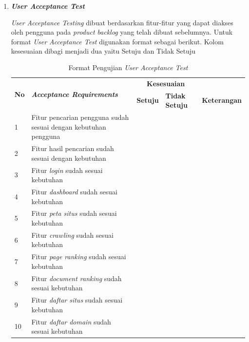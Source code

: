 \begin{enumerate}[leftmargin=1\parindent]
	\item \textit{\textbf{User Acceptance Test}}
	
	\textit{User Acceptance Testing} dibuat berdasarkan fitur-fitur yang dapat diakses oleh pengguna pada \textit{product backlog} yang telah dibuat sebelumnya. Untuk format \textit{User Acceptance Test} digunakan format sebagai berikut. Kolom kesesuaian dibagi menjadi dua yaitu Setuju dan Tidak Setuju
	
	\begin{longtable}{@{}|p{0.5cm}|p{5cm}|p{3cm}|p{3cm}|p{2cm}|@{}}
		
		\caption{Format Pengujian \textit{User Acceptance Test}}\\
		\hline
		\multirow{2}{5cm}{\textbf{No}} & \multirow{2}{5cm}{\textbf{\textit{Acceptance Requirements}}} & \multicolumn{2}{c|}{\textbf{Kesesuaian}} &	 \\
		\cline{3-4}
		\textbf{} & \textbf{\textit{}} & \textbf{Setuju} & \textbf{Tidak Setuju} & \textbf{Keterangan} \\
		\hline
		1 & Fitur pencarian pengguna sudah sesuai dengan kebutuhan pengguna &  & & \\
		\hline
		2 & Fitur hasil pencarian sudah sesuai dengan kebutuhan &  & & \\
		\hline
		3 & Fitur \textit{login} sudah sesuai kebutuhan &  & &   \\
		\hline
		4 & Fitur \textit{dashboard} sudah sesuai kebutuhan &  & & \\
		\hline
		5 & Fitur \textit{peta situs} sudah sesuai kebutuhan  &  &  & \\
		\hline
		6 & Fitur \textit{crawling} sudah sesuai kebutuhan &  &  & \\
		\hline
		7 & Fitur \textit{page ranking} sudah sesuai kebutuhan & &  & \\
		\hline
		
		8 & Fitur \textit{document ranking} sudah sesuai kebutuhan & &  &  \\
		\hline
		9 & Fitur \textit{daftar situs} sudah sesuai kebutuhan & &  & \\
		\hline
		10 & Fitur \textit{daftar domain} sudah sesuai kebutuhan &  &  & \\
		
		
		\hline
		
	\end{longtable}
\end{enumerate}

